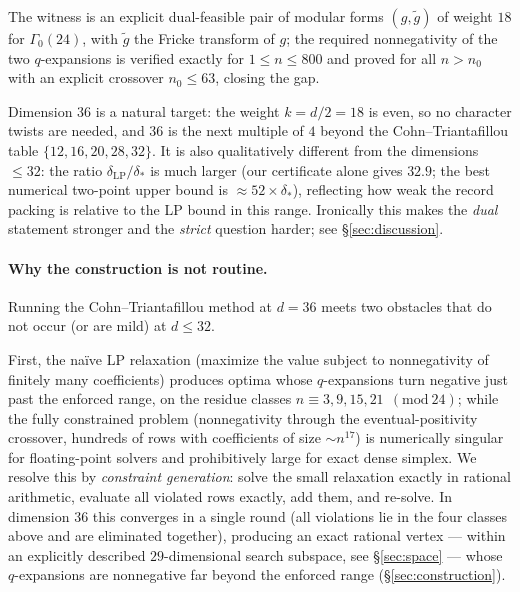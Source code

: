 \documentclass[11pt]{article}
\theoremstyle{remark}
\newcommand{\LP}{\mathrm{LP}}
\begin{document}
The witness is an explicit dual-feasible pair of modular forms
$(g,\tilde g)$ of weight $18$ for $\Gamma_0(24)$, with $\tilde g$ the
Fricke transform of $g$; the required nonnegativity of the two
$q$-expansions is verified exactly for $1\le n\le 800$ and proved for
all $n>n_0$ with an explicit crossover $n_0\le 63$, closing the gap.

Dimension $36$ is a natural target: the weight $k=d/2=18$ is even, so no
character twists are needed, and $36$ is the next multiple of $4$ beyond the
Cohn--Triantafillou table $\{12,16,20,28,32\}$. It is also qualitatively different from the dimensions
$\le 32$: the ratio $\delta_{\LP}/\delta_*$ is much larger (our
certificate alone gives $32.9$; the best numerical two-point upper
bound is $\approx 52\times\delta_*$), reflecting how weak the record packing is
relative to the LP bound in this range. Ironically this makes the
\emph{dual} statement stronger and the \emph{strict} question harder;
see \S\ref{sec:discussion}.

\paragraph{Why the construction is not routine.}
Running the Cohn--Triantafillou method at $d=36$ meets two obstacles
that do not occur (or are mild) at $d\le 32$.

First, the na\"ive LP relaxation (maximize the value subject to
nonnegativity of finitely many coefficients) produces optima whose
$q$-expansions turn negative just past the enforced range, on the
residue classes $n\equiv 3,9,15,21\ \  (\mathrm{mod}\ 24)$; while the
fully constrained problem (nonnegativity through the eventual-positivity
crossover, hundreds of rows with coefficients of size $\sim n^{17}$) is
numerically singular for floating-point solvers and prohibitively large
for exact dense simplex. We resolve this by \emph{constraint
generation}: solve the small relaxation exactly in rational arithmetic,
evaluate all violated rows exactly, add them, and re-solve. In dimension
$36$ this converges in a single round (all violations lie in the four
classes above and are eliminated together), producing an exact rational
vertex --- within an explicitly described $29$-dimensional search
subspace, see \S\ref{sec:space} --- whose $q$-expansions are nonnegative
far beyond the enforced range (\S\ref{sec:construction}).
\end{document}
